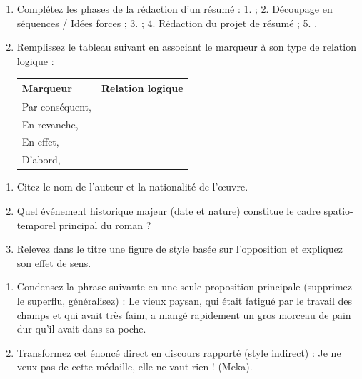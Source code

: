 \documentclass[11pt]{article}
\begin{document}
\begin{exercice}
\begin{enumerate}
    \item Complétez les phases de la rédaction d'un résumé : 
    1. \underline{\hspace{4cm}} ; 
    2. Découpage en séquences / Idées forces ; 
    3. \underline{\hspace{4cm}} ; 
    4. Rédaction du projet de résumé ; 
    5. \underline{\hspace{4cm}}.
    \item Remplissez le tableau suivant en associant le marqueur à son type de relation logique :
    \begin{center}
    \begin{tabular}{|l|c|}
    \hline
    \textbf{Marqueur} & \textbf{Relation logique} \\ \hline
    Par conséquent, & \\ \hline
    En revanche, & \\ \hline
    En effet, & \\ \hline
    D'abord, & \\ \hline
    \end{tabular}
    \end{center}
\end{enumerate}
\end{exercice}

\begin{exercice}
\begin{enumerate}
    \item Citez le nom de l'auteur et la nationalité de l'œuvre.
    \item Quel événement historique majeur (date et nature) constitue le cadre spatio-temporel principal du roman ?
    \item Relevez dans le titre une figure de style basée sur l'opposition et expliquez son effet de sens.
\end{enumerate}
\end{exercice}

\begin{exercice}
\begin{enumerate}
    \item Condensez la phrase suivante en une seule proposition principale (supprimez le superflu, généralisez) : 
    \og Le vieux paysan, qui était fatigué par le travail des champs et qui avait très faim, a mangé rapidement un gros morceau de pain dur qu'il avait dans sa poche.\fg{}
    \item Transformez cet énoncé direct en discours rapporté (style indirect) : 
    \og Je ne veux pas de cette médaille, elle ne vaut rien !\fg{} (Meka).
\end{enumerate}
\end{exercice}
\end{document}
